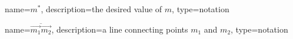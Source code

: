 	\newcommand{\desired}[1]{\ensuremath{{#1}^{*}}}
	{%
		name=\desired{m},
		description=the desired value of $m$,
		type=notation
	}

	\newcommand{\vecline}[2]{\ensuremath{\overline{#1#2}}}
	{%
		name=\ensuremath{\vecline{\vec{m_1}}{\vec{m_2}}},
		description=a line connecting points $m_1$ and $m_2$,
		type=notation
	}

	\newcommand{\interval}[1]{\ensuremath{\overbracket[0.1mm][0.5mm]{#1}}}


	\DeclarePairedDelimiter{\ceil}{\lceil}{\rceil}
	\DeclarePairedDelimiter{\floor}{\lfloor}{\rfloor}

	\DeclareMathOperator{\rank}{rank}

	\DeclareMathOperator{\diam}{diam}
	\DeclareMathOperator{\diag}{diag}
	\DeclareMathOperator*{\argmax}{arg\,max}
	\DeclareMathOperator*{\argmin}{arg\,min}


